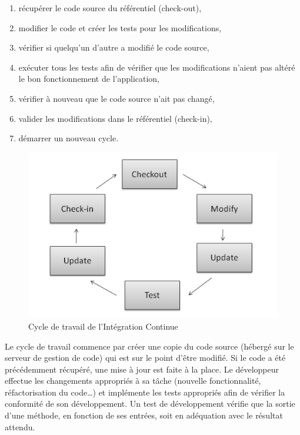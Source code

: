     \begin{enumerate}
      \item récupérer le code source du référentiel (\gls{check-out}),
      \item modifier le code et créer les tests pour les modifications,
      \item vérifier si quelqu'un d'autre a modifié le code source,
      \item exécuter tous les tests afin de vérifier que les modifications n’aient pas altéré le bon fonctionnement de l’application,
      \item vérifier à nouveau que le code source n'ait pas changé,
      \item valider les modifications dans le référentiel (\gls{check-in}),
      \item démarrer un nouveau cycle.\\
    \end{enumerate}

    \begin{figure}
      \begin{center}
        \includegraphics[scale=0.5]{images/ICWorkflow.png}
      \end{center}
      \caption{Cycle de travail de l’Intégration Continue}
      \label{IC workflow}
    \end{figure}

    Le cycle de travail commence par créer une copie du code source (hébergé sur le serveur de gestion de code) qui est sur le point d'être modifié. Si le code a été précédemment récupéré, une mise à jour est faite à la place. Le développeur effectue les changements appropriés à sa tâche (nouvelle fonctionnalité, réfactorisation du code…) et implémente les tests appropriés afin de vérifier la conformité de son développement. Un test de développement vérifie que la sortie d’une méthode, en fonction de ses entrées, soit en adéquation avec le résultat attendu.\\

